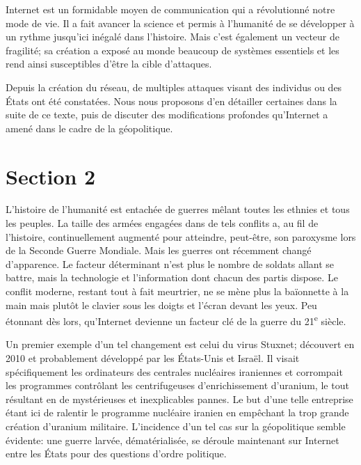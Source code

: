 \documentclass[article]{yReport}
\begin{document}
	Internet est un formidable moyen de communication qui a révolutionné notre mode de vie.
	Il a fait avancer la science et permis à l'humanité de se développer à un rythme jusqu'ici inégalé dans l'histoire.
	Mais c'est également un vecteur de fragilité; sa création a exposé au monde beaucoup de systèmes essentiels et les rend ainsi susceptibles d'être la cible d'attaques.
	
	Depuis la création du réseau, de multiples attaques visant des individus ou des États ont été constatées.
	Nous nous proposons d'en détailler certaines dans la suite de ce texte, puis de discuter des modifications profondes qu'Internet a amené dans le cadre de la géopolitique.
	
	\section{Section 2}
	L'histoire de l'humanité est entachée de guerres mêlant toutes les ethnies et tous les peuples.
	La taille des armées engagées dans de tels conflits a, au fil de l'histoire, continuellement augmenté pour atteindre, peut-être, son paroxysme lors de la Seconde Guerre Mondiale.
	Mais les guerres ont récemment changé d'apparence.
	Le facteur déterminant n'est plus le nombre de soldats allant se battre, mais la technologie et l'information dont chacun des partis dispose.
	Le conflit moderne, restant tout à fait meurtrier, ne se mène plus la baïonnette à la main mais plutôt le clavier sous les doigts et l'écran devant les yeux.	Peu étonnant dès lors, qu'Internet devienne un facteur clé de la guerre du 21\textsuperscript{e} siècle.
	
	Un premier exemple d'un tel changement est celui du virus Stuxnet; découvert en 2010 et probablement développé par les États-Unis et Israël.
	Il visait spécifiquement les ordinateurs des centrales nucléaires iraniennes et corrompait les programmes contrôlant les centrifugeuses d'enrichissement d'uranium, le tout résultant en de mystérieuses et inexplicables pannes.
	Le but d'une telle entreprise étant ici de ralentir le programme nucléaire iranien en empêchant la trop grande création d'uranium militaire.
	L'incidence d'un tel cas sur la géopolitique semble évidente: une guerre larvée, dématérialisée, se déroule maintenant sur Internet entre les États pour des questions d'ordre politique.
	
\end{document}
